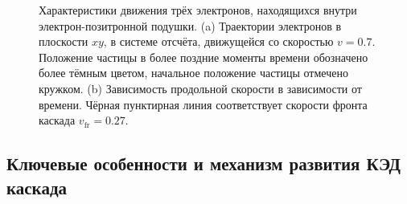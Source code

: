 \begin{figure}[h!]
    \caption[Характеристики движения отдельных электронов, находящихся внутри электрон-позитронной подушки.]{\label{fig:ch2/sec1/tracks} Характеристики движения трёх электронов, находящихся внутри электрон-позитронной подушки. (a) Траектории электронов в плоскости $xy$, в системе отсчёта, движущейся со скоростью $v=0.7$. Положение частицы в более поздние моменты времени обозначено более тёмным цветом, начальное положение частицы отмечено кружком. (b) Зависимость продольной скорости в зависимости от времени. Чёрная пунктирная линия соответствует скорости фронта каскада $v_\mathrm{fr} = 0.27$.}
\end{figure}

\subsection{Ключевые особенности и механизм развития КЭД каскада}
\label{sub:ch2/sec2/Mechanism}

